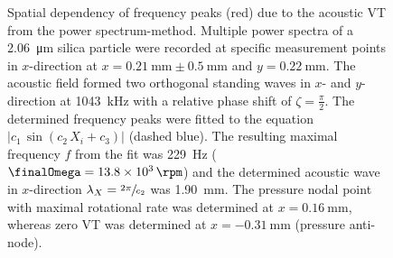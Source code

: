 \begin{figure}[tb]
  \centering
    \caption{Spatial dependency of frequency peaks (red) due to the acoustic VT 
      from the power spectrum-method. Multiple power spectra of a 
      \SI{2.06}{\micro\meter} silica particle were recorded at specific 
      measurement points in $x$-direction at $x=\SI{0.21}{\mm}\pm\SI{0.5}{\mm}$ 
      and $y=\SI{0.22}{\mm}$. The acoustic field formed two orthogonal standing 
      waves in $x$- and $y$-direction at \SI{1043}{\kilo\hertz} with a relative 
      phase shift of $\zeta =\frac{\pi}{2}$. The determined frequency peaks were 
      fitted to the equation $\left|c_{1}\,\sin(c_2\,X_i + c_3)\right|$ (dashed 
      blue).  The resulting maximal frequency $f$  from the fit was 
      \SI{229}{\hertz} ($ \finalOmega = \SI{13.8e3}{\rpm}$) and the determined 
      acoustic wave in $x$-direction $\lambda_{X}=\sfrac{2\pi}{c_2}$ was 
    \SI{1.90}{\mm}. The pressure nodal point with maximal rotational rate was 
  determined at $x=\SI{0.16}{\mm}$, whereas zero VT was determined at 
$x=\SI{-0.31}{\mm}$ (pressure anti-node).\label{fig:Fig10}}
\end{figure}
